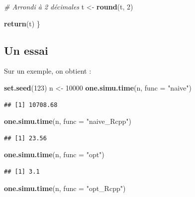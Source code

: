 \documentclass[
]{article}
\newenvironment{Shaded}{\begin{snugshade}}{\end{snugshade}}
\newcommand{\AttributeTok}[1]{\textcolor[rgb]{0.13,0.29,0.53}{#1}}
\newcommand{\CommentTok}[1]{\textcolor[rgb]{0.56,0.35,0.01}{\textit{#1}}}
\newcommand{\DecValTok}[1]{\textcolor[rgb]{0.00,0.00,0.81}{#1}}
\newcommand{\FunctionTok}[1]{\textcolor[rgb]{0.13,0.29,0.53}{\textbf{#1}}}
\newcommand{\NormalTok}[1]{#1}
\newcommand{\OtherTok}[1]{\textcolor[rgb]{0.56,0.35,0.01}{#1}}
\newcommand{\StringTok}[1]{\textcolor[rgb]{0.31,0.60,0.02}{#1}}
\begin{document}
\begin{Shaded}
\begin{Highlighting}[]
  \CommentTok{\# Arrondi à 2 décimales}
\NormalTok{  t }\OtherTok{\textless{}{-}} \FunctionTok{round}\NormalTok{(t, }\DecValTok{2}\NormalTok{)}

  \FunctionTok{return}\NormalTok{(t)}
\NormalTok{\}}
\end{Highlighting}
\end{Shaded}

\subsection{Un essai}\label{un-essai}

Sur un exemple, on obtient :

\begin{Shaded}
\begin{Highlighting}[]
\FunctionTok{set.seed}\NormalTok{(}\DecValTok{123}\NormalTok{)}
\NormalTok{n }\OtherTok{\textless{}{-}} \DecValTok{10000}
\FunctionTok{one.simu.time}\NormalTok{(n, }\AttributeTok{func =} \StringTok{"naive"}\NormalTok{)}
\end{Highlighting}
\end{Shaded}

\begin{verbatim}
## [1] 10708.68
\end{verbatim}

\begin{Shaded}
\begin{Highlighting}[]
\FunctionTok{one.simu.time}\NormalTok{(n, }\AttributeTok{func =} \StringTok{"naive\_Rcpp"}\NormalTok{)}
\end{Highlighting}
\end{Shaded}

\begin{verbatim}
## [1] 23.56
\end{verbatim}

\begin{Shaded}
\begin{Highlighting}[]
\FunctionTok{one.simu.time}\NormalTok{(n, }\AttributeTok{func =} \StringTok{"opt"}\NormalTok{)}
\end{Highlighting}
\end{Shaded}

\begin{verbatim}
## [1] 3.1
\end{verbatim}

\begin{Shaded}
\begin{Highlighting}[]
\FunctionTok{one.simu.time}\NormalTok{(n, }\AttributeTok{func =} \StringTok{"opt\_Rcpp"}\NormalTok{)}
\end{Highlighting}
\end{Shaded}
\end{document}
